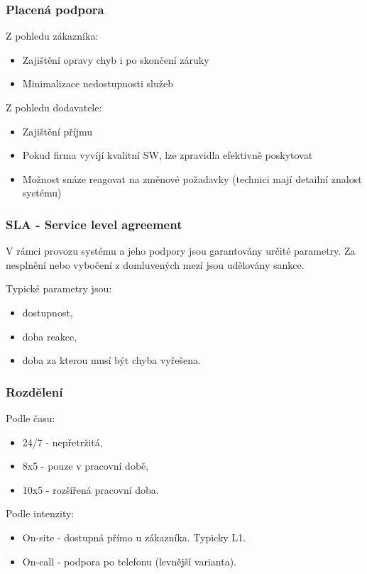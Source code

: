       \subsubsection{Placená podpora}
        Z pohledu zákazníka:
        \begin{itemize}
          \item Zajištění opravy chyb i po skončení záruky
          \item Minimalizace nedostupnosti služeb
        \end{itemize}

        Z pohledu dodavatele:
        \begin{itemize}
          \item Zajištění příjmu
          \item Pokud firma vyvíjí kvalitní SW, lze zpravidla efektivně poskytovat
          \item Možnost snáze reagovat na změnové požadavky (technici mají detailní znalost systému)
        \end{itemize}

      \subsubsection{SLA - Service level agreement}
        V rámci provozu systému a jeho podpory jsou garantovány určité parametry.
        Za nesplnění nebo vybočení z domluvených mezí jsou udělovány sankce.

        Typické parametry jsou:
        \begin{itemize}
          \item dostupnost,
          \item doba reakce,
          \item doba za kterou musí být chyba vyřešena.
        \end{itemize}

      \subsubsection{Rozdělení}
        Podle času:
        \begin{itemize}
          \item 24/7 - nepřetržitá,
          \item 8x5 - pouze v pracovní době,
          \item 10x5 - rozšířená pracovní doba.
        \end{itemize}

        Podle intenzity:
        \begin{itemize}
          \item On-site - dostupná přímo u zákazníka. Typicky L1.
          \item On-call - podpora po telefonu (levnější varianta).
        \end{itemize}
